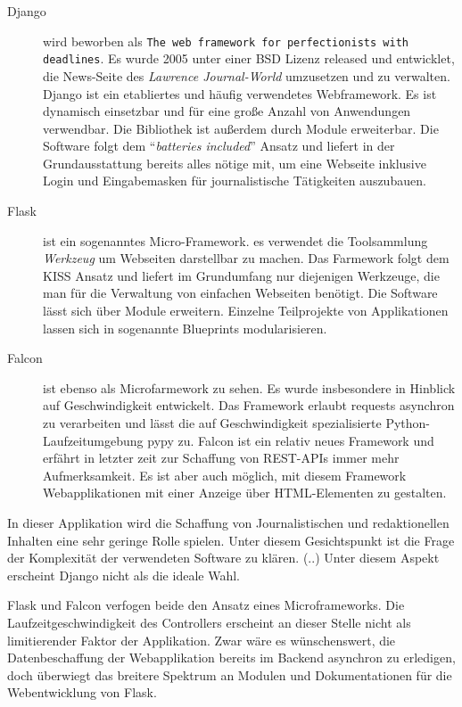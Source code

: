 \begin{description}
 \item [Django] wird beworben als \texttt{The web framework for perfectionists with dead\-lines}. Es wurde 2005 unter einer BSD Lizenz released und entwicklet, die News-Seite des \textit{Lawrence Journal-World} umzusetzen und zu verwalten. Django ist ein etabliertes und häufig verwendetes Webframework. Es ist dynamisch einsetzbar und für eine große Anzahl von Anwendungen verwendbar. Die Bibliothek ist außerdem durch Module erweiterbar. Die Software folgt dem "`\textit{batteries included}"' Ansatz und liefert in der Grundausstattung bereits alles nötige mit, um eine Webseite inklusive Login und Eingabemasken für journalistische Tätigkeiten auszubauen.
 
 \item [Flask] ist ein sogenanntes Micro-Framework. es verwendet die Toolsammlung \textit{Werkzeug} um Webseiten darstellbar zu machen. Das Farmework folgt dem KISS Ansatz und liefert im Grundumfang nur diejenigen Werkzeuge, die man für die Verwaltung von einfachen Webseiten benötigt. Die Software lässt sich über Module erweitern. Einzelne Teilprojekte von Applikationen lassen sich in sogenannte Blueprints modularisieren. 
 
 \item [Falcon] ist ebenso als Microfarmework zu sehen. Es wurde insbesondere in Hinblick auf Geschwindigkeit entwickelt. Das Framework erlaubt requests asynchron zu verarbeiten und lässt die auf Geschwindigkeit spezialisierte Python-Laufzeitumgebung pypy zu. Falcon ist ein relativ neues Framework und erfährt in letzter zeit zur Schaffung von REST-APIs immer mehr Aufmerksamkeit. Es ist aber auch möglich, mit diesem Framework Webapplikationen mit einer Anzeige über HTML-Elementen zu gestalten. 
\end{description}

In dieser Applikation wird die Schaffung von Journalistischen und redaktionellen Inhalten eine sehr geringe Rolle spielen. Unter diesem Gesichtspunkt ist die Frage der Komplexität der verwendeten Software zu klären. (..) Unter diesem Aspekt erscheint Django nicht als die ideale Wahl.

Flask und Falcon verfogen beide den Ansatz eines Microframeworks. Die Laufzeitgeschwindigkeit des Controllers erscheint an dieser Stelle nicht als limitierender Faktor der Applikation. Zwar wäre es wünschenswert, die Datenbeschaffung der Webapplikation bereits im Backend asynchron zu erledigen, doch überwiegt das breitere Spektrum an Modulen und Dokumentationen für die Webentwicklung von Flask.


